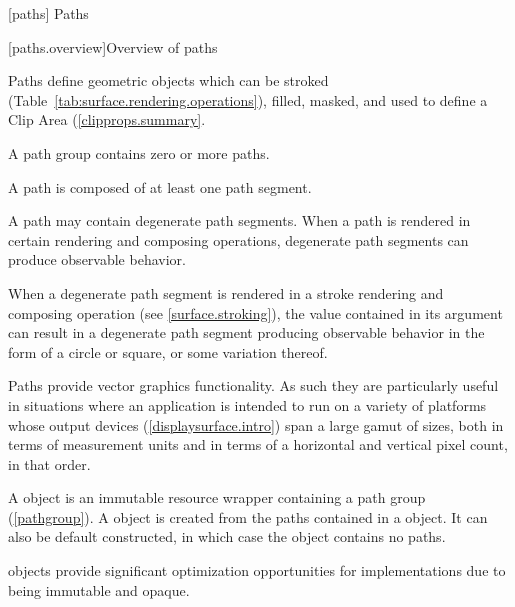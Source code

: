 
 [paths] {Paths}

 [paths.overview]{Overview of paths}

\pnum
Paths define geometric objects which can be stroked (Table~\ref{tab:surface.rendering.operations}), filled, masked, and used to define a Clip Area (\ref{clipprops.summary}.

\pnum
A path group contains zero or more paths.

\pnum
A path is composed of at least one path segment.

\pnum
A path may contain degenerate path segments. When a path is rendered in certain rendering and composing operations, degenerate path segments can produce observable behavior.
\begin{example}
When a degenerate path segment is rendered in a stroke rendering and composing operation (see \ref{surface.stroking}), the  value contained in its  argument can result in a degenerate path segment producing observable behavior in the form of a circle or square, or some variation thereof.
\end{example}

\pnum
Paths provide vector graphics functionality. As such they are particularly useful in situations where an application is intended to run on a variety of platforms whose output devices (\ref{displaysurface.intro}) span a large gamut of sizes, both in terms of measurement units and in terms of a horizontal and vertical pixel count, in that order.
%

\pnum
A  object is an immutable resource wrapper containing a path group (\ref{pathgroup}). A  object is created from the paths contained in a  object. It can also be default constructed, in which case the  object contains no paths.
\begin{note}
 objects provide significant optimization opportunities for implementations due to being immutable and opaque.
\end{note}



